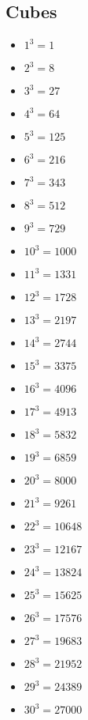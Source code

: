 \begin{multicols}{2}
\section{Cubes}
\begin{itemize}
    \item \(1^{3} = 1\)
    \item \(2^{3} = 8\)
    \item \(3^{3} = 27\)
    \item \(4^{3} = 64\)
    \item \(5^{3} = 125\)
    \item \(6^{3} = 216\)
    \item \(7^{3} = 343\)
    \item \(8^{3} = 512\)
    \item \(9^{3} = 729\)
    \item \({10}^{3} = 1000\)
    \item \({11}^{3} = 1331\)
    \item \({12}^{3} = 1728\)
    \item \({13}^{3} = 2197\)
    \item \({14}^{3} = 2744\)
    \item \({15}^{3} = 3375\)
    \item \({16}^{3} = 4096\)
    \item \({17}^{3} = 4913\)
    \item \({18}^{3} = 5832\)
    \item \({19}^{3} = 6859\)
    \item \({20}^{3} = 8000\)
    \item \({21}^{3} = 9261\)
    \item \({22}^{3} = 10648\)
    \item \({23}^{3} = 12167\)
    \item \({24}^{3} = 13824\)
    \item \({25}^{3} = 15625\)
    \item \({26}^{3} = 17576\)
    \item \({27}^{3} = 19683\)
    \item \({28}^{3} = 21952\)
    \item \({29}^{3} = 24389\)
    \item \({30}^{3} = 27000\)
\end{itemize}

\end{multicols}
